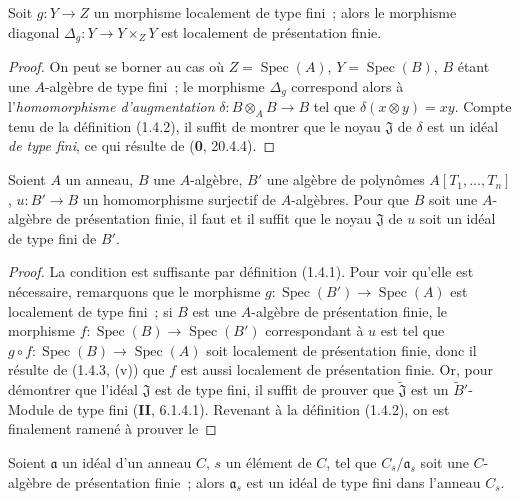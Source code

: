 \begin{corollary}[1.4.3.1]
\label{IV.1.4.3.1-fr}
Soit $g:Y\to Z$ un morphisme localement de type fini~; alors le morphisme
diagonal $\Delta_g:Y\to Y\times_ZY$ est localement de présentation finie.
\end{corollary}


\begin{proof}
On peut se borner au cas où $Z=\operatorname{Spec}(A)$, $Y=\operatorname{Spec}(B)$, $B$ étant une
$A$-algèbre de type fini~; le morphisme $\Delta_g$ correspond alors à
l'\emph{homomorphisme d'augmentation} $\delta:B\otimes_AB\to B$ tel que
$\delta(x\otimes y)=xy$. Compte tenu de la définition (1.4.2), il suffit de
montrer que le noyau $\mathfrak J$ de $\delta$ est un idéal \emph{de type
fini}, ce qui résulte de (\textbf{0}, 20.4.4).
\end{proof}

\begin{proposition}[1.4.4]
\label{IV.1.4.4-fr}
Soient $A$ un anneau, $B$ une $A$-algèbre, $B'$ une algèbre de polynômes
$A[T_1,\ldots,T_n]$, $u:B'\to B$ un homomorphisme surjectif de
$A$-algèbres. Pour que $B$ soit une $A$-algèbre de présentation finie, il faut
et il suffit que le noyau $\mathfrak J$ de $u$ soit un idéal de type fini de
$B'$.
\end{proposition}

\begin{proof}
La condition est suffisante par définition (1.4.1). Pour voir qu'elle est
nécessaire, remarquons que le morphisme $g:\operatorname{Spec}(B')\to\operatorname{Spec}(A)$ est
localement de type fini~; si $B$ est une $A$-algèbre de présentation finie,
le morphisme $f:\operatorname{Spec}(B)\to\operatorname{Spec}(B')$ correspondant à $u$ est tel que
$g\circ f:\operatorname{Spec}(B)\to\operatorname{Spec}(A)$ soit localement de présentation finie, donc il
résulte de (1.4.3, (v)) que $f$ est aussi localement de présentation finie.
Or, pour démontrer que l'idéal $\mathfrak J$ est de type fini, il suffit de
prouver que $\widetilde{\mathfrak J}$ est un $\widetilde{B}'$-Module de type
fini (\textbf{II}, 6.1.4.1). Revenant à la définition (1.4.2), on est finalement ramené
à prouver le
\end{proof}

\begin{lemma}[1.4.4.1]
\label{IV.1.4.4.1-fr}
Soient $\mathfrak a$ un idéal d'un anneau $C$, $s$ un élément de $C$, tel que
$C_s/\mathfrak a_s$ soit une $C$-algèbre de présentation finie~; alors
$\mathfrak a_s$ est un idéal de type fini dans l'anneau $C_s$.
\end{lemma}

